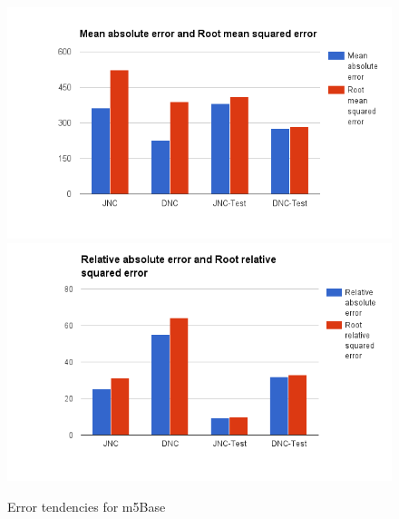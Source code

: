 \begin{figure}[h!]
\centering
\includegraphics[scale=0.4]{figures/m5Base_2.png} 
\includegraphics[scale=0.4]{figures/m5Base_3.png} 
\caption{Error tendencies for m5Base}
\label{fig:error_m5base}
\end{figure}


